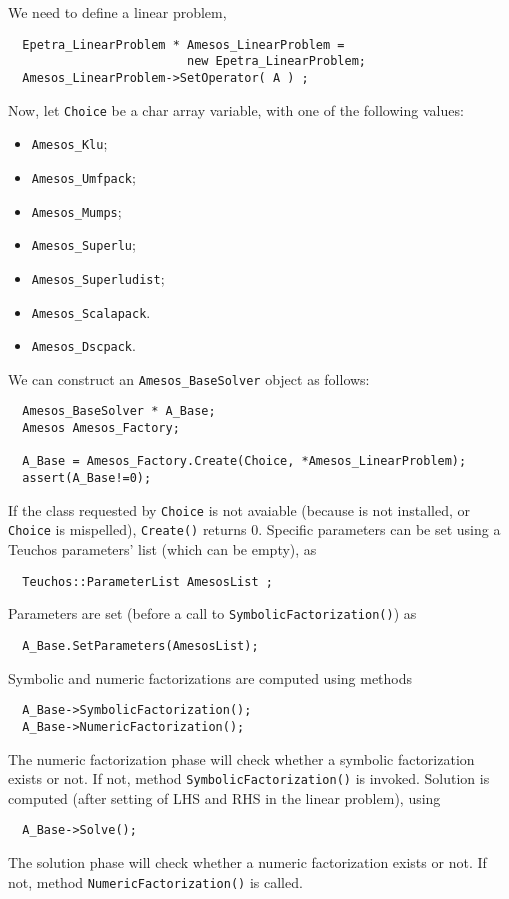 \documentclass[11pt]{SANDreport}
\begin{document}
We need to define a linear problem,
\begin{verbatim}
  Epetra_LinearProblem * Amesos_LinearProblem = 
                         new Epetra_LinearProblem;
  Amesos_LinearProblem->SetOperator( A ) ; 
\end{verbatim}
Now, let \verb!Choice! be a char array variable, with one of the
following values: 
\begin{itemize}
\item {\tt Amesos\_Klu};
\item {\tt Amesos\_Umfpack};
\item {\tt Amesos\_Mumps};
\item {\tt Amesos\_Superlu};
\item {\tt Amesos\_Superludist};
\item {\tt Amesos\_Scalapack}.
\item {\tt Amesos\_Dscpack}.
\end{itemize}
We can construct an \verb!Amesos_BaseSolver! object as follows:
\begin{verbatim}
  Amesos_BaseSolver * A_Base;
  Amesos Amesos_Factory;

  A_Base = Amesos_Factory.Create(Choice, *Amesos_LinearProblem);
  assert(A_Base!=0);
\end{verbatim}
If the class requested by \verb!Choice! is not avaiable (because is not
installed, or \verb!Choice! is mispelled), \verb!Create()! returns 0.
Specific parameters can be set using a Teuchos parameters' list (which
can be empty), as
\begin{verbatim}
  Teuchos::ParameterList AmesosList ;
\end{verbatim}
Parameters are set (before a call to \verb!SymbolicFactorization()!) as
\begin{verbatim}
  A_Base.SetParameters(AmesosList);
\end{verbatim}
Symbolic and numeric factorizations are computed using methods
\begin{verbatim}
  A_Base->SymbolicFactorization();
  A_Base->NumericFactorization();
\end{verbatim}
The numeric factorization phase will check whether a symbolic
factorization exists or not. If not, method
\verb!SymbolicFactorization()! is invoked.  Solution is computed (after
setting of LHS and RHS in the linear problem), using
\begin{verbatim}
  A_Base->Solve();
\end{verbatim}
The solution phase will check whether a numeric factorization exists or
not. If not, method \verb!NumericFactorization()! is called.
\end{document}
